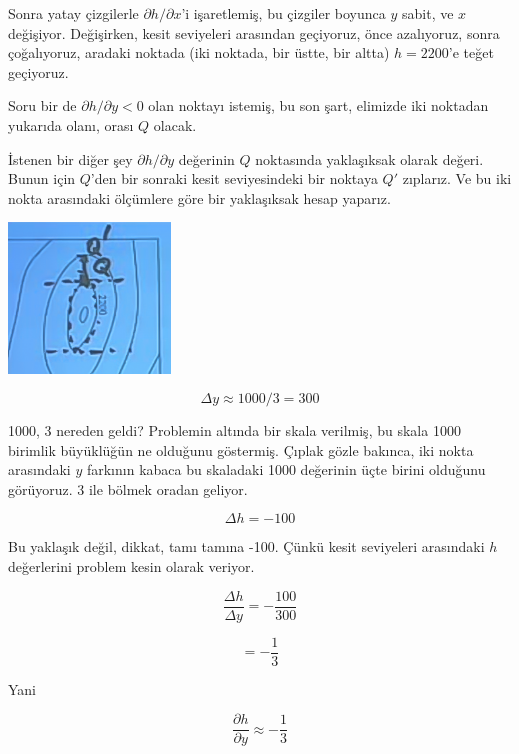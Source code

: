 \documentclass[12pt,fleqn]{article}\usepackage{../../common}
\begin{document}
Sonra yatay çizgilerle $\partial h/\partial x$'i işaretlemiş, bu çizgiler
boyunca $y$ sabit, ve $x$ değişiyor. Değişirken, kesit seviyeleri arasından
geçiyoruz, önce azalıyoruz, sonra çoğalıyoruz, aradaki noktada (iki
noktada, bir üstte, bir altta) $h=2200$'e teğet geçiyoruz. 

Soru bir de  $\partial h/\partial y < 0$ olan noktayı istemiş, bu son şart,
elimizde iki noktadan yukarıda olanı, orası $Q$ olacak. 

İstenen bir diğer şey $\partial h/\partial y$ değerinin $Q$ noktasında
yaklaşıksak olarak değeri. Bunun için $Q$'den bir sonraki kesit
seviyesindeki bir noktaya $Q'$ zıplarız. Ve bu iki nokta arasındaki
ölçümlere göre bir yaklaşıksak hesap yaparız.

\begin{center}
\includegraphics[height=4cm]{15_4.png}
\end{center}

$$ \Delta y \approx 1000 / 3 = 300 $$

1000, 3 nereden geldi? Problemin altında bir skala verilmiş, bu skala 1000
birimlik büyüklüğün ne olduğunu göstermiş. Çıplak gözle bakınca, iki nokta
arasındaki $y$ farkının kabaca bu skaladaki 1000 değerinin üçte birini
olduğunu görüyoruz. 3 ile bölmek oradan geliyor. 

$$ \Delta h = -100 $$

Bu yaklaşık değil, dikkat, tamı tamına -100. Çünkü kesit seviyeleri
arasındaki $h$ değerlerini problem kesin olarak veriyor.

$$ 
\frac{\Delta h}{\Delta y} = -\frac{100}{300}
 $$

$$ = -\frac{1}{3} $$

Yani 

$$ 
\frac{\partial h}{\partial y} \approx -\frac{1}{3}
 $$
\end{document}
